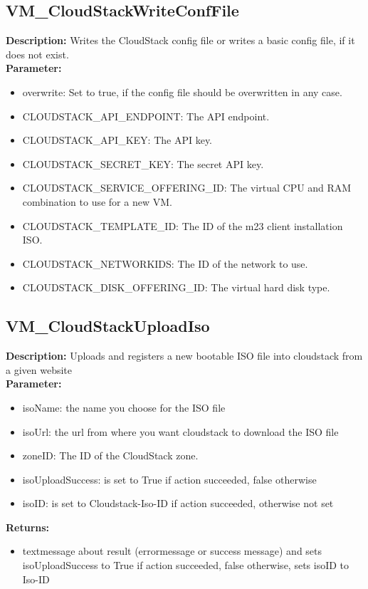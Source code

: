 \subsection{VM\_CloudStackWriteConfFile}
\textbf{Description:} Writes the CloudStack config file or writes a basic config file, if it does not exist.\\
\textbf{Parameter:}
\begin{itemize}
\item overwrite: Set to true, if the config file should be overwritten in any case.
\item CLOUDSTACK\_API\_ENDPOINT: The API endpoint.
\item CLOUDSTACK\_API\_KEY: The API key.
\item CLOUDSTACK\_SECRET\_KEY: The secret API key.
\item CLOUDSTACK\_SERVICE\_OFFERING\_ID: The virtual CPU and RAM combination to use for a new VM.
\item CLOUDSTACK\_TEMPLATE\_ID: The ID of the m23 client installation ISO.
\item CLOUDSTACK\_NETWORKIDS: The ID of the network to use.
\item CLOUDSTACK\_DISK\_OFFERING\_ID: The virtual hard disk type.
\end{itemize}

\subsection{VM\_CloudStackUploadIso}
\textbf{Description:} Uploads and registers a new bootable ISO file into cloudstack from a given website\\
\textbf{Parameter:}
\begin{itemize}
\item isoName: the name you choose for the ISO file 
\item isoUrl: the url from where you want cloudstack to download the ISO file
\item zoneID: The ID of the CloudStack zone.
\item isoUploadSuccess: is set to True if action succeeded, false otherwise
\item isoID: is set to Cloudstack-Iso-ID if action succeeded, otherwise not set
\end{itemize}
\textbf{Returns:}
\begin{itemize}
\item textmessage about result (errormessage or success message) and sets isoUploadSuccess to True if action succeeded, false otherwise, sets isoID to Iso-ID
\end{itemize}

